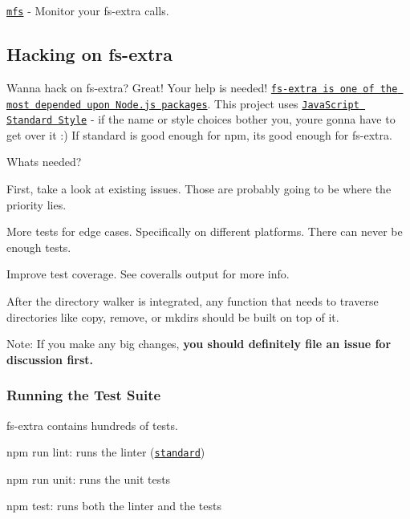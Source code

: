 \begin{DoxyItemize}
\item \href{https://github.com/cadorn/mfs}{\tt mfs} -\/ Monitor your fs-\/extra calls.
\end{DoxyItemize}

\subsection*{Hacking on fs-\/extra }

Wanna hack on {\ttfamily fs-\/extra}? Great! Your help is needed! \href{http://nodei.co/npm/fs-extra.png?downloads=true&downloadRank=true&stars=true}{\tt fs-\/extra is one of the most depended upon Node.\+js packages}. This project uses \href{https://github.com/feross/standard}{\tt Java\+Script Standard Style} -\/ if the name or style choices bother you, you\textquotesingle{}re gonna have to get over it \+:) If {\ttfamily standard} is good enough for {\ttfamily npm}, it\textquotesingle{}s good enough for {\ttfamily fs-\/extra}.

\href{https://github.com/feross/standard}{\tt }

What\textquotesingle{}s needed?
\begin{DoxyItemize}
\item First, take a look at existing issues. Those are probably going to be where the priority lies.
\item More tests for edge cases. Specifically on different platforms. There can never be enough tests.
\item Improve test coverage. See coveralls output for more info.
\item After the directory walker is integrated, any function that needs to traverse directories like {\ttfamily copy}, {\ttfamily remove}, or {\ttfamily mkdirs} should be built on top of it.
\end{DoxyItemize}

Note\+: If you make any big changes, {\bfseries you should definitely file an issue for discussion first.}

\subsubsection*{Running the Test Suite}

fs-\/extra contains hundreds of tests.


\begin{DoxyItemize}
\item {\ttfamily npm run lint}\+: runs the linter (\href{http://standardjs.com/}{\tt standard})
\item {\ttfamily npm run unit}\+: runs the unit tests
\item {\ttfamily npm test}\+: runs both the linter and the tests
\end{DoxyItemize}

